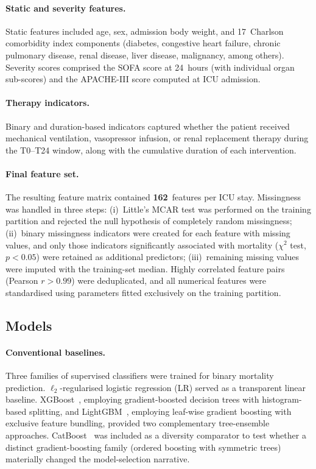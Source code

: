 \documentclass[11pt]{article}
\begin{document}
\paragraph{Static and severity features.}
Static features included age, sex, admission body weight, and 17~Charlson
comorbidity index components (diabetes, congestive heart failure, chronic
pulmonary disease, renal disease, liver disease, malignancy, among others).
Severity scores comprised the SOFA score at 24~hours (with individual organ
sub-scores) and the APACHE-III score computed at ICU admission.

\paragraph{Therapy indicators.}
Binary and duration-based indicators captured whether the patient received
mechanical ventilation, vasopressor infusion, or renal replacement therapy
during the T0--T24 window, along with the cumulative duration of each
intervention.

\paragraph{Final feature set.}
The resulting feature matrix contained \textbf{162}~features per ICU stay.
Missingness was handled in three steps: (i)~Little's MCAR test was performed on
the training partition and rejected the null hypothesis of completely random
missingness; (ii)~binary missingness indicators were created for each feature
with missing values, and only those indicators significantly associated with
mortality ($\chi^2$ test, $p < 0.05$) were retained as additional predictors;
(iii)~remaining missing values were imputed with the training-set median.
Highly correlated feature pairs (Pearson $r > 0.99$) were deduplicated, and all
numerical features were standardised using parameters fitted exclusively on the
training partition.

\subsection{Models}\label{sec:models}

\paragraph{Conventional baselines.}
Three families of supervised classifiers were trained for binary mortality
prediction.  $\ell_2$-regularised logistic regression (LR) served as a transparent linear baseline.  XGBoost~\citep{Chen2016}, employing gradient-boosted decision trees with histogram-based splitting, and LightGBM~\citep{Ke2017}, employing leaf-wise gradient boosting with exclusive feature bundling, provided two complementary tree-ensemble approaches.
CatBoost~\citep{Prokhorenkova2018} was included as a diversity comparator to
test whether a distinct gradient-boosting family (ordered boosting with
symmetric trees) materially changed the model-selection narrative.
\end{document}
